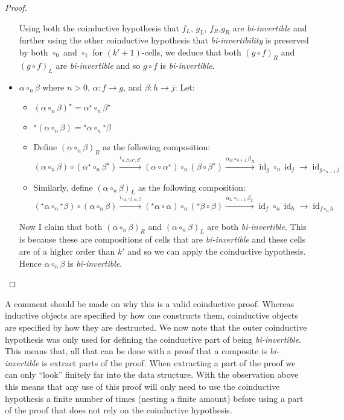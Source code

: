 \documentclass{article}
\theoremstyle{definition}
\theoremstyle{examplestyle}
\DeclareMathOperator{\id}{id}
\newcommand{\linv}[1]{{}^\star\!#1}
\newcommand{\rinv}[1]{#1^\star}
\begin{document}
\begin{proof}
\begin{itemize}
      Using both the coinductive hypothesis that \(f_L\), \(g_L\), \(f_R\),\(g_R\) are \emph{bi-invertible} and further using the other coinductive hypothesis that \emph{bi-invertibility} is preserved by both \(\circ_0\) and \(\circ_1\) for \((k'+1)\)-cells, we deduce that both \((g \circ f)_R\) and \((g \circ f)_L\) are \emph{bi-invertible} and so \(g \circ f\) is \emph{bi-invertible}.
    \item \(\alpha \circ_n \beta\) where \(n > 0\), \(\alpha: f \to g\), and \(\beta: h \to j\): Let:
      \begin{itemize}
      \item \(\rinv {(\alpha \circ_n \beta)} = \rinv \alpha \circ_n \rinv \beta\)
      \item \(\linv {(\alpha \circ_n \beta)} = \linv \alpha \circ_n \linv \beta\)
      \item Define \((\alpha \circ_n \beta)_R\) as the following composition:
        \begin{equation*}
          (\alpha \circ_n \beta) \circ (\rinv \alpha \circ_n \rinv \beta) \overset {i_{\alpha,\beta,\rinv \alpha, \rinv \beta}} \to (\alpha \circ \rinv \alpha) \circ_n (\beta \circ \rinv \beta) \overset {\alpha _R \circ_{n+1} \beta _R} \to \id_g \circ_n \id_j \to \id_{g \circ_{n-1} j}
        \end{equation*}
      \item Similarly, define \((\alpha \circ_n \beta)_L\) as the following composition:
        \begin{equation*}
          (\linv \alpha \circ_n \linv \beta) \circ (\alpha \circ_n \beta) \overset {i_{\linv \alpha, \linv \beta, \alpha, \beta}} \to (\linv \alpha \circ \alpha) \circ_n (\linv \beta \circ \beta) \overset {\alpha _L \circ_{n+1} \beta _L} \to \id_f \circ_n \id_h \to \id_{f \circ_n h}
        \end{equation*}
    \end{itemize}
    Now I claim that both \((\alpha \circ_n \beta)_R\) and \((\alpha \circ_n \beta)_L\) are both \emph{bi-invertible}. This is because these are compositions of cells that are \emph{bi-invertible} and these cells are of a higher order than \(k'\) and so we can apply the coinductive hypothesis. Hence \(\alpha \circ_n \beta\) is \emph{bi-invertible}.
  \end{itemize}
\end{proof}
A comment should be made on why this is a valid coinductive proof. Whereas inductive objects are specified by how one constructs them, coinductive objects are specified by how they are destructed. We now note that the outer coinductive hypothesis was only used for defining the coinductive part of being \emph{bi-invertible}. This means that, all that can be done with a proof that a composite is \emph{bi-invertible} is extract parts of the proof. When extracting a part of the proof we can only ``look'' finitely far into the data structure. With the observation above this means that any use of this proof will only need to use the coinductive hypothesis a finite number of times (nesting a finite amount) before using a part of the proof that does not rely on the coinductive hypothesis.
\end{document}
